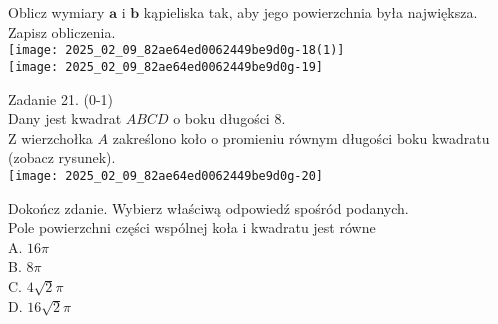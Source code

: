 \documentclass[10pt]{article}
\begin{document}
Oblicz wymiary \(\boldsymbol{a}\) i \(\boldsymbol{b}\) kąpieliska tak, aby jego powierzchnia była największa.\\
Zapisz obliczenia.\\
\texttt{[image: 2025\_02\_09\_82ae64ed0062449be9d0g-18(1)]}\\
\texttt{[image: 2025\_02\_09\_82ae64ed0062449be9d0g-19]}

Zadanie 21. (0-1)\\
Dany jest kwadrat \(A B C D\) o boku długości 8.\\
Z wierzchołka \(A\) zakreślono koło o promieniu równym długości boku kwadratu (zobacz rysunek).\\
\texttt{[image: 2025\_02\_09\_82ae64ed0062449be9d0g-20]}

Dokończ zdanie. Wybierz właściwą odpowiedź spośród podanych.\\
Pole powierzchni części wspólnej koła i kwadratu jest równe\\
A. \(16 \pi\)\\
B. \(8 \pi\)\\
C. \(4 \sqrt{2} \pi\)\\
D. \(16 \sqrt{2} \pi\)
\end{document}
